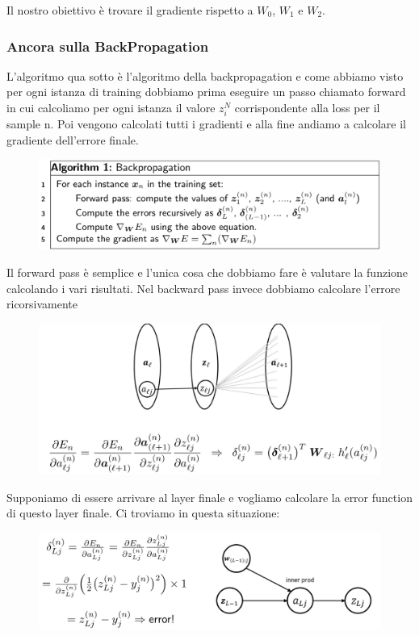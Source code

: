 \documentclass[14pt]{extreport}
\begin{document}
Il nostro obiettivo è trovare il gradiente rispetto a $W_0$, $W_1$ e $W_2$.

\subsubsection{Ancora sulla BackPropagation}

L'algoritmo qua sotto è l'algoritmo della backpropagation e come abbiamo visto per ogni istanza di training dobbiamo prima eseguire un passo chiamato
forward in cui calcoliamo per ogni istanza il valore $z_i^N$ corrispondente alla loss per il sample n. Poi vengono calcolati tutti i gradienti e alla
fine andiamo a calcolare il gradiente dell'errore finale.

\begin{figure}[H]
\centering
\includegraphics[width=0.7\linewidth]{399.jpeg}
\end{figure}

Il forward pass è semplice e l'unica cosa che dobbiamo fare è valutare la funzione calcolando i vari risultati. Nel backward pass invece dobbiamo
calcolare l'errore ricorsivamente

\begin{figure}[H]
\centering
\includegraphics[width=0.7\linewidth]{400.jpeg}
\end{figure}

Supponiamo di essere arrivare al layer finale e vogliamo calcolare la error function di questo layer finale. Ci troviamo in questa situazione:
\begin{figure}[H]
\centering
\includegraphics[width=\linewidth]{401.jpeg}
\end{figure}
\end{document}
